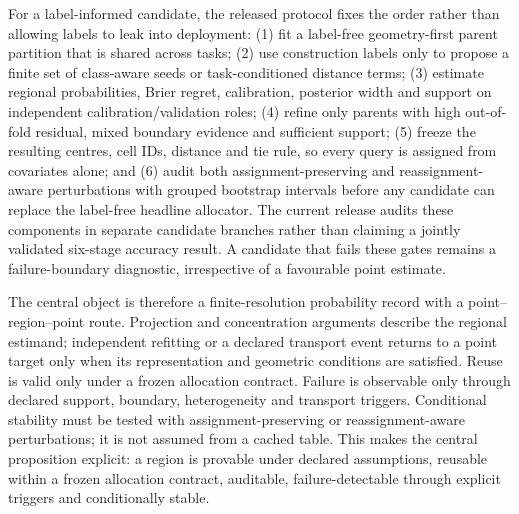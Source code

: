\documentclass[10pt]{article}
\begin{document}
For a label-informed candidate, the released protocol fixes the order rather than allowing labels to leak into deployment: (1) fit a label-free geometry-first parent partition that is shared across tasks; (2) use construction labels only to propose a finite set of class-aware seeds or task-conditioned distance terms; (3) estimate regional probabilities, Brier regret, calibration, posterior width and support on independent calibration/validation roles; (4) refine only parents with high out-of-fold residual, mixed boundary evidence and sufficient support; (5) freeze the resulting centres, cell IDs, distance and tie rule, so every query is assigned from covariates alone; and (6) audit both assignment-preserving and reassignment-aware perturbations with grouped bootstrap intervals before any candidate can replace the label-free headline allocator. The current release audits these components in separate candidate branches rather than claiming a jointly validated six-stage accuracy result. A candidate that fails these gates remains a failure-boundary diagnostic, irrespective of a favourable point estimate.

The central object is therefore a finite-resolution probability record with a point--region--point route. Projection and concentration arguments describe the regional estimand; independent refitting or a declared transport event returns to a point target only when its representation and geometric conditions are satisfied. Reuse is valid only under a frozen allocation contract. Failure is observable only through declared support, boundary, heterogeneity and transport triggers. Conditional stability must be tested with assignment-preserving or reassignment-aware perturbations; it is not assumed from a cached table. This makes the central proposition explicit: a region is provable under declared assumptions, reusable within a frozen allocation contract, auditable, failure-detectable through explicit triggers and conditionally stable.
\end{document}
